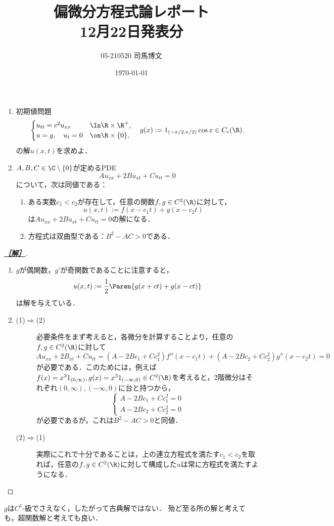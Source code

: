 \documentclass[uplatex,dvipdfmx]{jsarticle}
\title{偏微分方程式論レポート\\12月22日発表分}\author{05-210520 司馬博文}\date{\today}
\begin{document}
\setcounter{section}{1}

\begin{problem}\mbox{}
    \begin{enumerate}
        \item 初期値問題
        \[\begin{cases}
            u_{tt}=c^2u_{xx}&\In\R\times\R^+,\\
            u=g,\quad u_t=0&\on\R\times\{0\},
        \end{cases}\quad g(x):=1_{(-\pi/2,\pi/2)}\cos x\in C_c(\R).\]
        の解$u(x,t)$を求めよ．
        \item $A,B,C\in\C\setminus\{0\}$が定めるPDE
        \[Au_{xx}+2Bu_{xt}+Cu_{tt}=0\]
        について，次は同値である：
        \begin{enumerate}
            \item ある実数$c_1<c_2$が存在して，任意の関数$f,g\in C^2(\R)$に対して，
            \[u(x,t):=f(x-c_1t)+g(x-c_2t)\]
            は$Au_{xx}+2Bu_{xt}+Cu_{tt}=0$の解になる．
            \item 方程式は双曲型である：$B^2-AC>0$である．
        \end{enumerate}
    \end{enumerate}
\end{problem}
\begin{proof}[\bf\underline{［解］}]\mbox{}
    \begin{enumerate}
        \item $g$が偶関数，$g'$が奇関数であることに注意すると，
        \[u(x,t):=\frac{1}{2}\Paren{g(x+ct)+g(x-ct)}\]
        は解を与えている．
        \item \begin{description}
            \item[(1)$\Rightarrow$(2)] 必要条件をまず考えると，各微分を計算することより，任意の$f,g\in C^2(\R)$に対して
            \[Au_{xx}+2B_{xt}+Cu_{tt}=(A-2Bc_1+Cc_1^2)f''(x-c_1t)+(A-2Bc_2+Cc_2^2)g''(x-c_2t)=0\]
            が必要である．このためには，例えば$f(x)=x^31_{(0,\infty)},g(x)=x^31_{(-\infty,0)}\in C^2(\R)$を考えると，2階微分はそれぞれ$(0,\infty),(-\infty,0)$に台と持つから，
            \[\begin{cases}
                A-2Bc_1+Cc_1^2=0\\
                A-2Bc_2+Cc_2^2=0
            \end{cases}\]
            が必要であるが，これは$B^2-AC>0$と同値．
            \item[(2)$\Rightarrow$(1)] 実際にこれで十分であることは，上の連立方程式を満たす$c_1<c_2$を取れば，任意の$f,g\in C^2(\R)$に対して構成した$u$は常に方程式を満たすようになる．
        \end{description}
    \end{enumerate}
\end{proof}
\begin{remarks}
    $g$は$C^1$-級でさえなく，したがって古典解ではない．
    殆ど至る所の解と考えても，超関数解と考えても良い．
\end{remarks}
\end{document}

